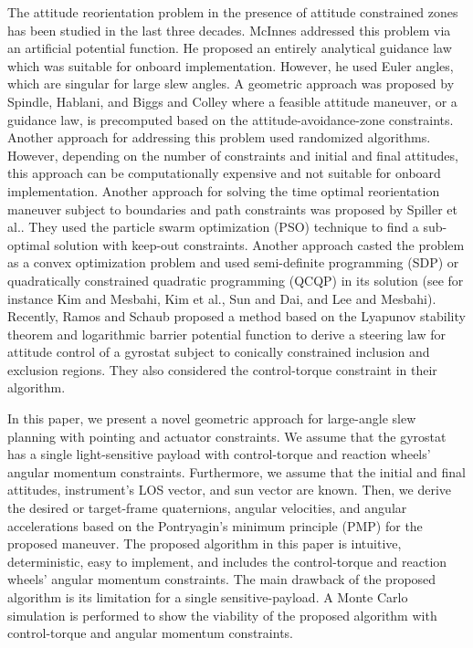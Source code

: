 \documentclass[journal ]{new-aiaa}
\begin{document}
	The attitude reorientation problem in the presence of attitude constrained zones has been studied in the last three decades. McInnes\cite{McInnes1994} addressed this problem via an artificial potential function. He proposed an entirely analytical guidance law which was suitable for onboard implementation. However, he used Euler angles, which are singular for large slew angles. 
	A geometric approach was proposed by Spindle\cite{Spindler1998}, Hablani\cite{Hablani1998}, and Biggs and Colley\cite{Biggs2016}  where a feasible attitude maneuver, or a guidance law, is precomputed based on the attitude-avoidance-zone constraints.  Another approach for addressing this problem used randomized algorithms\cite{Frazzoli01}. However, depending on the number of constraints and initial and final attitudes, this approach can be computationally expensive and not suitable for onboard implementation. Another approach for solving the time optimal reorientation maneuver subject to boundaries and path constraints was proposed by Spiller et al.\cite{Spiller2016}. They used the particle swarm optimization (PSO) technique to find a sub-optimal solution with keep-out constraints. Another approach casted the problem as a convex optimization problem and used semi-definite programming (SDP) or quadratically constrained quadratic programming (QCQP) in its solution (see for instance Kim and Mesbahi\cite{Kim2004}, Kim et al.\cite{Kim2010}, Sun and Dai\cite{Sun2015}, and Lee and Mesbahi\cite{Lee2014}). Recently, Ramos and Schaub\cite{Ramos2018} proposed a method based on the Lyapunov stability theorem and logarithmic barrier potential function to derive a steering law for attitude control of a gyrostat subject to conically constrained inclusion and exclusion regions. They also considered the control-torque constraint in their algorithm.  
	
In this paper, we present a novel geometric approach for large-angle slew planning with pointing and actuator constraints.  We assume that the gyrostat has a single light-sensitive payload with control-torque and reaction wheels' angular momentum constraints. Furthermore, we assume that the initial and final attitudes, instrument's LOS vector, and sun vector are known. Then, we derive the desired or target-frame quaternions, angular velocities, and angular accelerations based on the Pontryagin's minimum principle (PMP) for the proposed maneuver. The proposed algorithm in this paper is intuitive, deterministic, easy to implement, and includes the control-torque and reaction wheels' angular momentum constraints. The main drawback of the proposed algorithm is its limitation for a single sensitive-payload.  A Monte Carlo simulation is performed to show the viability of the proposed algorithm with control-torque and angular momentum constraints. 
	
\end{document}
